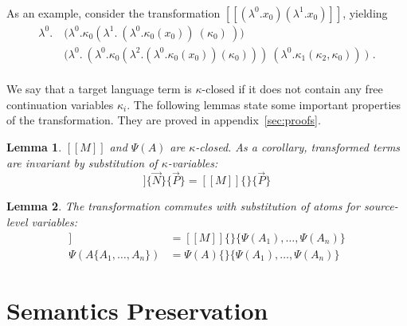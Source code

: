 \documentclass[a4paper,11pt,draft]{article}
\newtheorem{lemma}{\sffamily Lemma}
\begin{document}
\paragraph{}

As an example, consider the transformation
$[\![(\lambda^{0}.x_{0})(\lambda^{1}.x_{0})]\!]$, yielding
\begin{align*}
  \lambda^{0}. \:& \bigl( \lambda^{0}.\kappa_{0}(\lambda^{1}. \: (\lambda^{0}.\kappa_{0}(x_{0})) \: (\kappa_{0}) \: ) \bigr)\\
  & \bigl( \lambda^{0}. \: (\lambda^{0}.\kappa_{0}(\lambda^{2}.(\lambda^{0}.\kappa_{0}(x_{0}))(\kappa_{0}))) \: (\lambda^{0}.\kappa_{1}(\kappa_{2},\kappa_{
    0})) \: \bigr) \text{ .}
\end{align*}

\paragraph{}

We say that a target language term is $\kappa$-closed if it does not contain
any free continuation variables $\kappa_{i}$. The following lemmas state some
important properties of the transformation. They are proved in
appendix~\ref{sec:proofs}.

\begin{lemma}\label{lem:kappaclosed}
  $[\![M]\!]$ and $\Psi(A)$ are $\kappa$-closed. As a corollary, transformed
  terms are invariant by substitution of $\kappa$-variables:
  \begin{equation*}
    [\![M]\!]\{\vec{N}\}\{\vec{P}\} = [\![M]\!]\{\}\{\vec{P}\}
  \end{equation*}
\end{lemma}

\begin{lemma}\label{lem:commuting}
  The transformation commutes with substitution of atoms for source-level variables:
  \begin{align*}
    [\![M\{A_{1}, \ldots, A_{n}\}]\!] &= [\![M]\!]\{\}\{\Psi(A_{1}), \ldots, \Psi(A_{n})\} \\
    \Psi(A\{A_{1}, \ldots, A_{n}\})   &= \Psi(A)\{\}\{\Psi(A_{1}), \ldots, \Psi(A_{n})\}
  \end{align*}
\end{lemma}


\section{Semantics Preservation}\label{sec:semanticpreservation}
\end{document}
